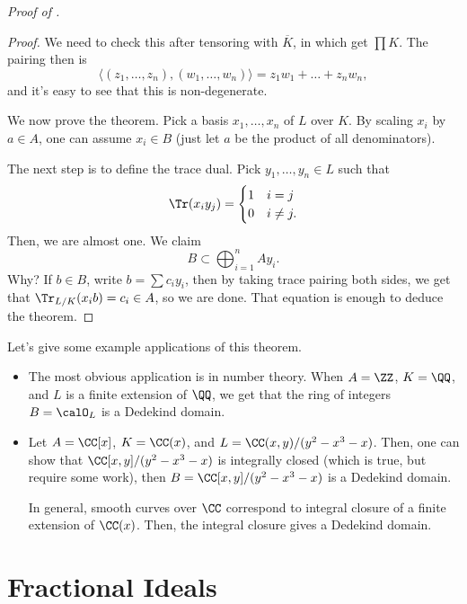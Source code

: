 \begin{proof}[Proof of ]
\begin{enumerate}
    \emph{Proof.} We need to check this after tensoring
    with $\overline K$, in which get $\prod K$.
    The pairing then is
    $$\langle (z_1,\dots,z_n), (w_1,\dots,w_n)\rangle
    = z_1w_1+\dots+z_nw_n,$$
    and it's easy to see that this is non-degenerate.
    \end{enumerate}
    
    We now prove the theorem.
    Pick a basis $x_1,\dots,x_n$ of $L$ over $K$.
    By scaling $x_i$ by $a\in A$, one can assume $x_i\in B$
    (just let $a$ be the product of all denominators).

    The next step is to define the trace dual.
    Pick $y_1,\dots,y_n\in L$ such that
    $$\Tr(x_iy_j) = \begin{cases}
	1 & i=j \\ 0 & i\neq j.
    \end{cases}$$
    Then, we are almost one. We claim
    $$B\subset\bigoplus_{i=1}^n Ay_i.$$
    Why? If $b\in B$, write $b=\sum c_iy_i$,
    then by taking trace pairing both sides,
    we get that $\Tr_{L/K}(x_i b) = c_i \in A$,
    so we are done.
    That equation is enough to deduce the theorem.
\end{proof}
Let's give some example applications of this theorem.
\begin{example}
\begin{itemize}
    \item The most obvious application is in number theory.
    When $A=\ZZ$, $K=\QQ$, and $L$ is a finite extension of $\QQ$,
    we get that 
    the ring of integers $B=\calO_L$ is a Dedekind domain.
    \item 
    Let $A=\CC[x]$, $K=\CC(x)$, and $L=\CC(x,y)/(y^2-x^3-x)$.
    Then, one can show that $\CC[x,y]/(y^2-x^3-x)$
    is integrally closed (which is true, but require some work),
    then $B=\CC[x,y]/(y^2-x^3-x)$ is a Dedekind domain.

    In general, smooth curves over $\CC$ correspond 
    to integral closure of a finite extension of $\CC(x)$.
    Then, the integral closure gives a Dedekind domain.
\end{itemize}
\end{example}
%
%
%
%
\section{Fractional Ideals}
